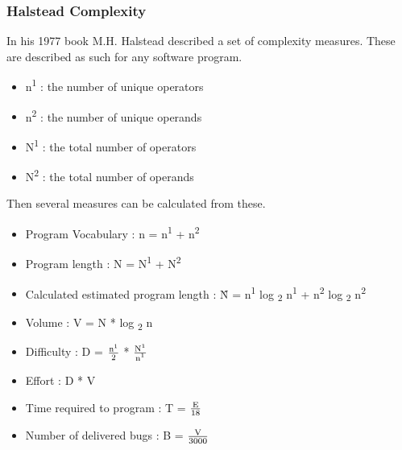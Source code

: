 \subsubsection{\textbf{Halstead Complexity}}
In his 1977 book M.H. Halstead described a set of complexity measures. \cite{HalsteadComplexity}
\newline
These are described as such for any software program.
\begin{itemize}
    \item n\textsuperscript{1} : the number of unique operators
    \item n\textsuperscript{2} : the number of unique operands
    \item N\textsuperscript{1} : the total number of operators
    \item N\textsuperscript{2} : the total number of operands
\end{itemize}
Then several measures can be calculated from these.
\begin{itemize}
    \item Program Vocabulary    : n = n\textsuperscript{1} + n\textsuperscript{2}
    \item Program length        : N = N\textsuperscript{1} + N\textsuperscript{2}
    \item Calculated estimated program length : \newline \^{N} = n\textsuperscript{1} log \textsubscript{2} n\textsuperscript{1} + n\textsuperscript{2} log \textsubscript{2} n\textsuperscript{2}
    \item Volume                : V = N * log \textsubscript{2} n
    \item Difficulty            : D =  $\frac{\text{n\textsuperscript{1}}}{\text{2}}$ * $\frac{\text{N\textsuperscript{1}}}{\text{n\textsuperscript{1}}}$
    \item Effort                : D * V
    \item Time required to program : T = $\frac{\text{E}}{\text{18}}$
    \item Number of delivered bugs : B = $\frac{\text{V}}{\text{3000}}$
\end{itemize}

